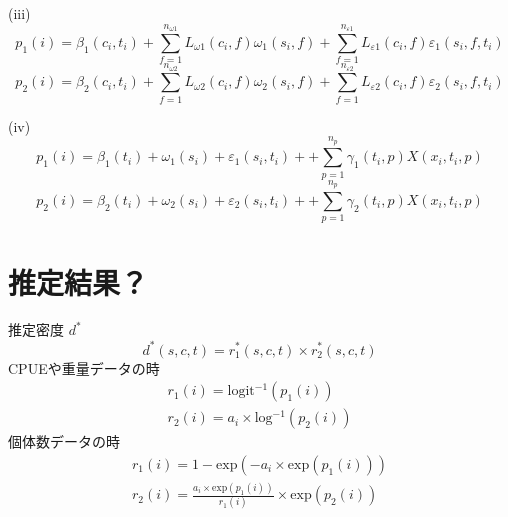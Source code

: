 \documentclass[11pt]{article}
\begin{document}
\hspace{1.2cm} (iii)
\begin{dmath}
  p_1(i) = \beta_{1}(c_{i}, t_{i}) + \sum_{f = 1}^{n_{\omega 1}} L_{\omega 1}(c_i, f) \omega_1(s_i, f) + \sum_{f = 1}^{n_{\varepsilon1}}L_{\varepsilon1}(c_i,f)\varepsilon_1(s_i,f,t_i)
\end{dmath}
\begin{dmath}
  p_2(i) = \beta_{2}(c_{i}, t_{i}) + \sum_{f = 1}^{n_{\omega 2}} L_{\omega 2}(c_i, f) \omega_2(s_i, f) + \sum_{f = 1}^{n_{\varepsilon2}}L_{\varepsilon2}(c_i,f)\varepsilon_2(s_i,f,t_i)
\end{dmath}
\hspace*{2cm}\dotfill

\hspace{1.2cm} (iv)
\begin{dmath}
  p_1(i) = \beta_{1}(t_{i}) + \omega_1(s_i) + \varepsilon_1(s_i,t_i) + +\sum_{p = 1}^{n_p}\gamma_1(t_i,p)X(x_i,t_i,p)
\end{dmath}
\begin{dmath}
  p_2(i) = \beta_{2}(t_{i}) + \omega_2(s_i) + \varepsilon_2(s_i,t_i) + +\sum_{p = 1}^{n_p}\gamma_2(t_i,p)X(x_i,t_i,p)
\end{dmath}

\newpage
{\huge{\section*{推定結果？}}}
推定密度 $d^*$
\begin{dmath}
d^*(s,c,t) = r_{1}^*(s,c,t) \times r_{2}^*(s,c,t)
\end{dmath}
\hspace{1.5cm}CPUEや重量データの時
\begin{eqnarray}
r_{1}(i) = \mathrm{logit^{-1}}(p_{1}(i)) \nonumber \\
r_{2}(i) = a_i \times \mathrm{log^{-1}}(p_{2}(i))
\end{eqnarray}
\hspace{1.5cm}個体数データの時
\begin{eqnarray}
r_{1}(i) = 1 - \mathrm{exp}(-a_i \times \mathrm{exp}(p_{1}(i))) \nonumber \\
r_{2}(i) = \frac{a_{i} \times \mathrm{exp}(p_{1}(i))} {r_{1}(i)} \times \mathrm{exp}(p_{2}(i))
\end{eqnarray}
\hrulefill
\end{document}
